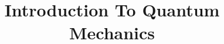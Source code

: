 \documentclass{article}
\begin{document}
\title{Introduction To Quantum Mechanics}
\maketitle
\tableofcontents

\newpage



\end{document}
